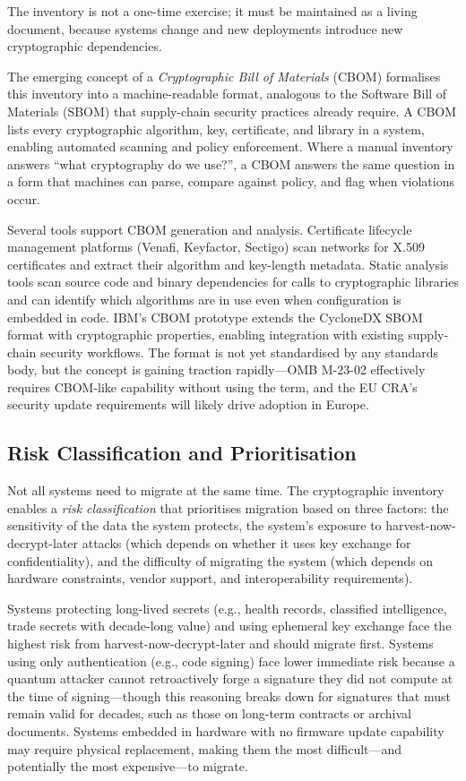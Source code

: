 The inventory is not a one-time exercise; it must be maintained as a living document, because systems change and new deployments introduce new cryptographic dependencies.

The emerging concept of a \emph{Cryptographic Bill of Materials} (CBOM) formalises this inventory into a machine-readable format, analogous to the Software Bill of Materials (SBOM) that supply-chain security practices already require. A CBOM lists every cryptographic algorithm, key, certificate, and library in a system, enabling automated scanning and policy enforcement. Where a manual inventory answers ``what cryptography do we use?'', a CBOM answers the same question in a form that machines can parse, compare against policy, and flag when violations occur.

Several tools support CBOM generation and analysis. Certificate lifecycle management platforms (Venafi, Keyfactor, Sectigo) scan networks for X.509 certificates and extract their algorithm and key-length metadata. Static analysis tools scan source code and binary dependencies for calls to cryptographic libraries and can identify which algorithms are in use even when configuration is embedded in code. IBM's CBOM prototype extends the CycloneDX SBOM format with cryptographic properties, enabling integration with existing supply-chain security workflows. The format is not yet standardised by any standards body, but the concept is gaining traction rapidly---OMB M-23-02 effectively requires CBOM-like capability without using the term, and the EU CRA's security update requirements will likely drive adoption in Europe.

\subsection{Risk Classification and Prioritisation}
\label{subsec:risk-classification}

Not all systems need to migrate at the same time. The cryptographic inventory enables a \emph{risk classification} that prioritises migration based on three factors: the sensitivity of the data the system protects, the system's exposure to harvest-now-decrypt-later attacks (which depends on whether it uses key exchange for confidentiality), and the difficulty of migrating the system (which depends on hardware constraints, vendor support, and interoperability requirements).

Systems protecting long-lived secrets (e.g., health records, classified intelligence, trade secrets with decade-long value) and using ephemeral key exchange face the highest risk from harvest-now-decrypt-later and should migrate first. Systems using only authentication (e.g., code signing) face lower immediate risk because a quantum attacker cannot retroactively forge a signature they did not compute at the time of signing---though this reasoning breaks down for signatures that must remain valid for decades, such as those on long-term contracts or archival documents. Systems embedded in hardware with no firmware update capability may require physical replacement, making them the most difficult---and potentially the most expensive---to migrate.

